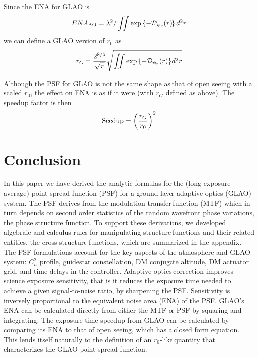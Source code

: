 \documentclass[11pt, oneside]{article}   	%
\begin{document}
 Since the ENA for GLAO is
 \begin{equation}
 ENA_{\rm AO} = \lambda^2 / \iint \exp\left\{-{\cal D}_{\psi_r}(r) \right\} d^2 r
 \end{equation}
 we can define a GLAO version of $r_0$ as
 \begin{equation}
 r_G = \frac{2^{8/5}}{\sqrt{\pi}} \sqrt{\iint \exp\left\{ -{\cal D}_{\psi_r}(r) \right\}d^2 r}
 \end{equation}
 
 Although the PSF for GLAO is not the same shape as that of open seeing with a scaled $r_0$, the effect on ENA is as if it were (with $r_G$ defined as above). The speedup factor is then
 \begin{equation}
 {\rm Seedup} = \left( \frac{r_G}{r_0} \right)^2
 \end{equation}

\section{Conclusion}

In this paper we have derived the analytic formulas for the (long exposure average) point spread function (PSF) for a ground-layer adaptive optics (GLAO) system. The PSF derives from the modulation transfer function (MTF) which in turn depends on second order statistics of the random wavefront phase variations, the phase structure function. To support these derivations, we developed algebraic and calculus rules for manipulating structure functions and their related entities, the cross-structure functions, which are summarized in the appendix. The PSF formulations account for the key aspects of the atmosphere and GLAO system: $C_n^2$ profile, guidestar constellation, DM conjugate altitude, DM actuator grid, and time delays in the controller. Adaptive optics correction improves science exposure sensitivity, that is it reduces the exposure time needed to achieve a given signal-to-noise ratio, by sharpening the PSF.  Sensitivity is inversely proportional to the equivalent noise area (ENA) of the PSF. GLAO's ENA can be calculated directly from either the MTF or PSF by squaring and integrating. The exposure time speedup from GLAO can be calculated by comparing its ENA to that of open seeing, which has a closed form equation. This lends itself naturally to the definition of an $r_0$-like quantity that characterizes the GLAO point spread function. 
\end{document}
